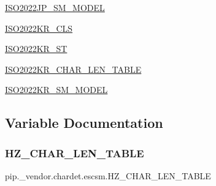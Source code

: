 \begin{DoxyCompactItemize}
\item 
\hyperlink{namespacepip_1_1__vendor_1_1chardet_1_1escsm_a421c6015068c595e78fc3638dbd73671}{I\+S\+O2022\+J\+P\+\_\+\+S\+M\+\_\+\+M\+O\+D\+EL}
\item 
\hyperlink{namespacepip_1_1__vendor_1_1chardet_1_1escsm_a960b51d7554c74c83427c0ab8761a3a1}{I\+S\+O2022\+K\+R\+\_\+\+C\+LS}
\item 
\hyperlink{namespacepip_1_1__vendor_1_1chardet_1_1escsm_a0c32217b4e9204d1acbb9a1cf90d4ffb}{I\+S\+O2022\+K\+R\+\_\+\+ST}
\item 
\hyperlink{namespacepip_1_1__vendor_1_1chardet_1_1escsm_a615d56ba08a7f64ef2281ec159bcd5a4}{I\+S\+O2022\+K\+R\+\_\+\+C\+H\+A\+R\+\_\+\+L\+E\+N\+\_\+\+T\+A\+B\+LE}
\item 
\hyperlink{namespacepip_1_1__vendor_1_1chardet_1_1escsm_a45b182e9a465f22746815e9178309e69}{I\+S\+O2022\+K\+R\+\_\+\+S\+M\+\_\+\+M\+O\+D\+EL}
\end{DoxyCompactItemize}


\subsection{Variable Documentation}
\mbox{\label{namespacepip_1_1__vendor_1_1chardet_1_1escsm_a10f7ae6bcecc7eed0aa7a3d23855688f}} 
\subsubsection{\texorpdfstring{H\+Z\+\_\+\+C\+H\+A\+R\+\_\+\+L\+E\+N\+\_\+\+T\+A\+B\+LE}{HZ\_CHAR\_LEN\_TABLE}}
{\footnotesize\ttfamily pip.\+\_\+vendor.\+chardet.\+escsm.\+H\+Z\+\_\+\+C\+H\+A\+R\+\_\+\+L\+E\+N\+\_\+\+T\+A\+B\+LE}

\mbox{\label{namespacepip_1_1__vendor_1_1chardet_1_1escsm_aea0c9d3ce5082af8a115a30ec60c4a71}} 
